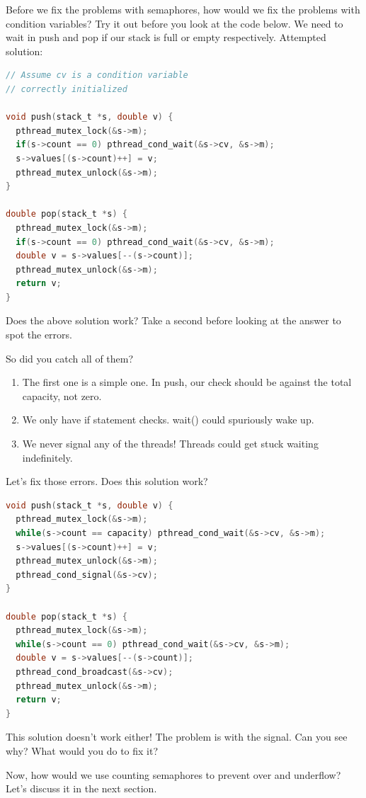 Before we fix the problems with semaphores,
how would we fix the problems with condition variables?
Try it out before you look at the code below.
We need to wait in push and pop if our stack is full or empty respectively.
Attempted solution:

\begin{lstlisting}[language=C]
// Assume cv is a condition variable
// correctly initialized

void push(stack_t *s, double v) {
  pthread_mutex_lock(&s->m);
  if(s->count == 0) pthread_cond_wait(&s->cv, &s->m);
  s->values[(s->count)++] = v;
  pthread_mutex_unlock(&s->m);
}

double pop(stack_t *s) {
  pthread_mutex_lock(&s->m);
  if(s->count == 0) pthread_cond_wait(&s->cv, &s->m);
  double v = s->values[--(s->count)];
  pthread_mutex_unlock(&s->m);
  return v;
}
\end{lstlisting}

Does the above solution work?
Take a second before looking at the answer to spot the errors.

So did you catch all of them?
\begin{enumerate}
\item The first one is a simple one. In push, our check should be against the total capacity, not zero.
\item We only have if statement checks. wait() could spuriously wake up.
\item We never signal any of the threads! Threads could get stuck waiting indefinitely.
\end{enumerate}

Let's fix those errors.
Does this solution work?

\begin{lstlisting}[language=C]
void push(stack_t *s, double v) {
  pthread_mutex_lock(&s->m);
  while(s->count == capacity) pthread_cond_wait(&s->cv, &s->m);
  s->values[(s->count)++] = v;
  pthread_mutex_unlock(&s->m);
  pthread_cond_signal(&s->cv);
}

double pop(stack_t *s) {
  pthread_mutex_lock(&s->m);
  while(s->count == 0) pthread_cond_wait(&s->cv, &s->m);
  double v = s->values[--(s->count)];
  pthread_cond_broadcast(&s->cv);
  pthread_mutex_unlock(&s->m);
  return v;
}
\end{lstlisting}

This solution doesn't work either!
The problem is with the signal.
Can you see why? What would you do to fix it?

Now, how would we use counting semaphores to prevent over and underflow?
Let's discuss it in the next section.

